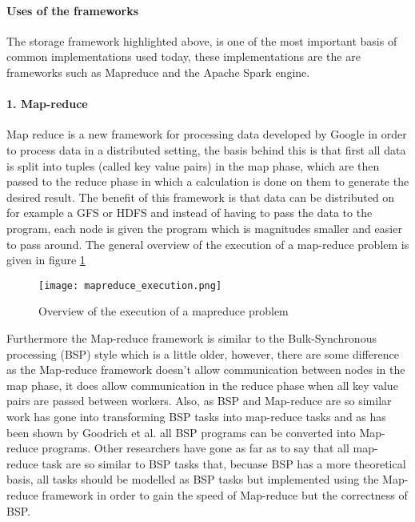 \paragraph{Uses of the frameworks}
The storage framework highlighted above, is one of the most important basis of common implementations used today,
these implementations are the are frameworks such as Mapreduce and the Apache Spark engine.

\paragraph{1. Map-reduce}
Map reduce is a new framework for processing data developed by Google\cite{Dean04} in order
to process data in a distributed setting, the basis behind this is that first all
data is split into tuples (called key value pairs) in the map phase, which are then passed to the reduce
phase in which a calculation is done on them to generate the desired result. The
benefit of this framework is that data can be distributed on for example a GFS or HDFS
and instead of having to pass the data to the program, each node is given the program
which is magnitudes smaller and easier to pass around. The general overview of
the execution of a map-reduce problem is given in figure \ref{mapreduce_execution}

\begin{figure}
  \texttt{[image: mapreduce\_execution.png]}
  \caption{Overview of the execution of a mapreduce problem\cite{Dean04}}
  \label{mapreduce_execution}
\end{figure}

Furthermore the Map-reduce framework is similar to the Bulk-Synchronous processing (BSP)
style which is a little older, however, there are some difference as the Map-reduce
framework doesn't allow communication between nodes in the map phase, it does allow
communication in the reduce phase when all key value pairs are passed between workers\cite{Pace12}.
Also, as BSP and Map-reduce are so similar work has gone into transforming BSP tasks into
map-reduce tasks and as has been shown by Goodrich et al.\cite{Goo11} all BSP programs can be
converted into Map-reduce programs. Other researchers have gone as far as to say
that all map-reduce task are so similar to BSP tasks that, becuase BSP has a more theoretical
basis, all tasks should be modelled as BSP tasks but implemented using the Map-reduce framework
in order to gain the speed of Map-reduce but the correctness of BSP\cite{Pace12}.

